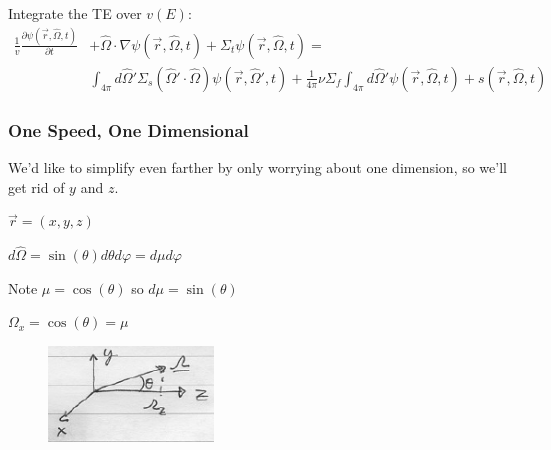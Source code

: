 \documentclass[12pt]{article}
\newcommand{\vOmega}{\ensuremath{\hat{\Omega}}}
\begin{document}
%
Integrate the TE over $v(E)$:
\begin{align}
\frac{1}{v}\frac{\partial \psi(\vec{r}, \vOmega, t)}{\partial t} &+ 
\vOmega \cdot \nabla \psi(\vec{r}, \vOmega, t) +
\Sigma_t \psi(\vec{r}, \vOmega, t) = \nonumber\\
%
& \int_{4\pi} d\vOmega' \Sigma_s(\vOmega' \cdot \vOmega) \psi(\vec{r}, \vOmega', t)  + \frac{1}{4\pi} \nu \Sigma_f \int_{4\pi} d\vOmega' \psi(\vec{r},  \vOmega, t) + s(\vec{r}, \vOmega, t) 
\end{align}
%



\subsubsection{One Speed, One Dimensional}

We'd like to simplify even farther by only worrying about one dimension, so we'll get rid of $y$ and $z$.

\begin{minipage}{0.5\textwidth}
$\vec{r} = (x, y, z)$

$d\vOmega = \sin(\theta) d\theta	d\varphi = d\mu d\varphi$

Note $\mu = \cos(\theta)$ so $d\mu = \sin(\theta)$

$\Omega_x = \cos(\theta) = \mu$
\end{minipage} \hfill
\begin{minipage}{0.45\textwidth}
\begin{figure}[H]
\includegraphics[height=1in]{1Dspace}
\end{figure}
\end{minipage}
\end{document}
